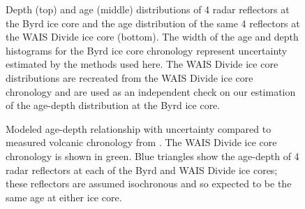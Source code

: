 \begin{figure}[h]
\centering
{}
\caption[]{Depth (top) and age (middle) distributions of 4 radar reflectors at the Byrd ice core and the age distribution of the same 4 reflectors at the WAIS Divide ice core (bottom). The width of the age and depth histograms for the Byrd ice core chronology represent uncertainty estimated by the methods used here. The WAIS Divide ice core distributions are recreated from the WAIS Divide ice core chronology \cite{buizert2015} and are used as an independent check on our estimation of the age-depth distribution at the Byrd ice core.}
\label{fig:layer_histo}
\end{figure}

\begin{figure}[h]
\centering
{}
\caption[]{Modeled age-depth relationship with uncertainty compared to measured volcanic chronology from \citet[open circles;][]{hammer1997}. The WAIS Divide ice core chronology \citep{buizert2015} is shown in green. Blue triangles show the age-depth of 4 radar reflectors at each of the Byrd and WAIS Divide ice cores; these reflectors are assumed isochronous and so expected to be the same age at either ice core.}
\label{fig:spaghetti}
\end{figure}